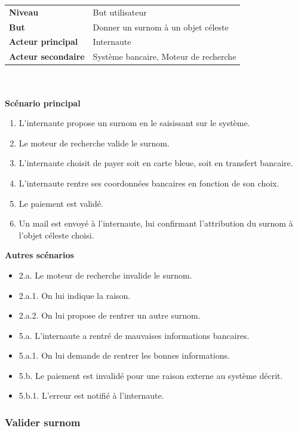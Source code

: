 \documentclass[11pt,a4paper]{article}
\begin{document}
\begin{tabular}{ll}
    \textbf{Niveau} & But utilisateur \\
    \textbf{But} & Donner un surnom à un objet céleste \\
    \textbf{Acteur principal} & Internaute \\
    \textbf{Acteur secondaire} & Système bancaire, Moteur de recherche \newline
\end{tabular}
~\\
~\\

\textbf{Scénario principal}

\begin{enumerate}
    \item L’internaute propose un surnom en le saisissant sur le système.
    \item Le moteur de recherche valide le surnom.
    \item L’internaute choisit de payer soit en carte bleue, soit en transfert bancaire.
    \item L’internaute rentre ses coordonnées bancaires en fonction de son choix.
    \item Le paiement est validé.
    \item Un mail est envoyé à l’internaute, lui confirmant l’attribution du surnom à l’objet céleste choisi.
\end{enumerate}

\textbf{Autres scénarios}

\begin{itemize}[label=]
    \item 2.a.  Le moteur de recherche invalide le surnom.
    \item 2.a.1.    On lui indique la raison.
    \item 2.a.2.    On lui propose de rentrer un autre surnom.
    \item 5.a.  L’internaute a rentré de mauvaises informations bancaires.
    \item 5.a.1.    On lui demande de rentrer les bonnes informations.
    \item 5.b.  Le paiement est invalidé pour une raison externe au système décrit.
    \item 5.b.1.    L’erreur est notifié à l’internaute.

\end{itemize}


\subsubsection{Valider surnom}
\end{document}

